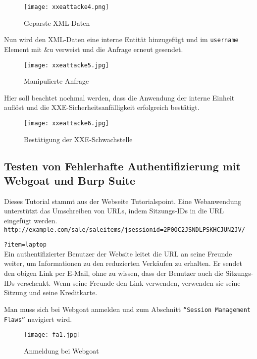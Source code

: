 \newpage

\begin{figure}[h]
	\centering
	\texttt{[image: xxeattacke4.png]}
	\caption{Geparste XML-Daten}
\end{figure}

Nun wird den XML-Daten eine interne Entität hinzugefügt und im \texttt{username} Element mit \&u verweist und die Anfrage erneut gesendet.

\begin{figure}[h]
	\centering
	\texttt{[image: xxeattacke5.jpg]}
	\caption{Manipulierte Anfrage}
\end{figure}

Hier soll beachtet nochmal werden, dass die Anwendung der interne Einheit auflöst und die XXE-Sicherheitsanfälligkeit erfolgreich bestätigt.

\begin{figure}[h]
	\centering
	\texttt{[image: xxeattacke6.jpg]}
	\caption{Bestätigung der XXE-Schwachstelle}
\end{figure}

\newpage

\subsection{Testen von Fehlerhafte Authentifizierung mit Webgoat und Burp Suite}
Dieses Tutorial stammt aus der Webseite Tutorialspoint\cite{tpfa15}.
Eine Webanwendung unterstützt das Umschreiben von URLs, indem Sitzungs-IDs in die URL eingefügt werden.\\

\texttt{http://example.com/sale/saleitems/jsessionid=2P0OC2JSNDLPSKHCJUN2JV/}

\texttt{?item=laptop}\\

Ein authentifizierter Benutzer der Website leitet die URL an seine Freunde weiter, um Informationen zu den reduzierten Verkäufen zu erhalten. Er sendet den obigen Link per E-Mail, ohne zu wissen, dass der Benutzer auch die Sitzungs-IDs verschenkt. Wenn seine Freunde den Link verwenden, verwenden sie seine Sitzung und seine Kreditkarte.

Man muss sich bei Webgoat anmelden und zum Abschnitt \texttt{"`Session Management Flaws"'} navigiert wird.

\begin{figure}[h]
	\centering
	\texttt{[image: fa1.jpg]}
	\caption{Anmeldung bei Webgoat}
\end{figure}

